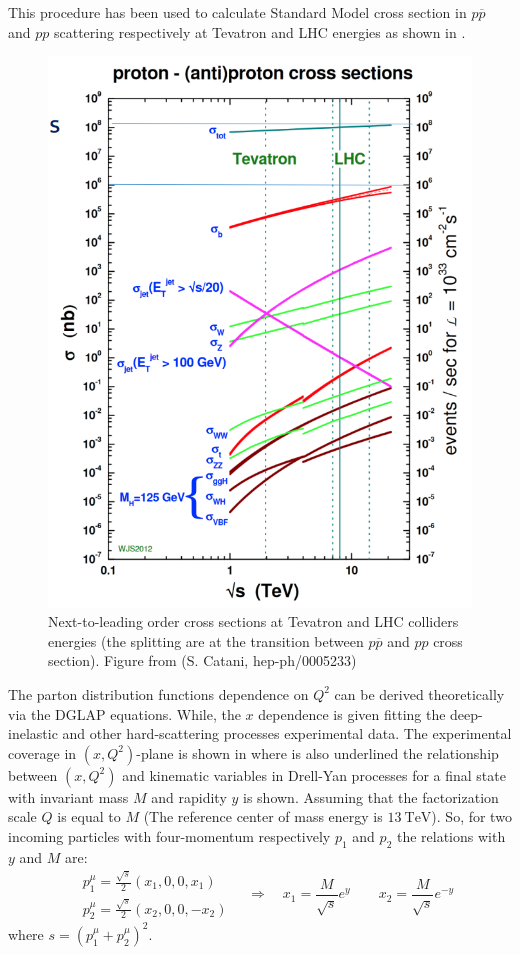 This procedure has been used to calculate Standard Model cross section in $p\overline{p}$ and $pp$ scattering respectively at Tevatron and LHC energies as shown in .

\begin{figure}[!ht]
	\centering 
	\includegraphics[width=12cm]{img/StandardModelCrossSections_color.png}
	\caption{Next-to-leading order cross sections at Tevatron and LHC colliders energies (the splitting are at the transition between $p\overline{p}$ and $pp$ cross section). Figure from (S. Catani, hep-ph/0005233)}
	\label{figure:StandardModelCrossSections}
\end{figure}

The parton distribution functions dependence on $Q^2$ can be derived theoretically via the DGLAP equations. While, the $x$ dependence is given fitting the deep-inelastic and other hard-scattering processes experimental data.
The experimental coverage in $(x,Q^2)$-plane is shown in  
where is also underlined the relationship between $(x,Q^2)$ and kinematic variables in Drell-Yan processes for a final state with invariant mass $M$ and rapidity $y$ is shown. Assuming that the factorization scale $Q$ is equal to $M$ (The reference center of mass energy is $13\ \mathrm{TeV}$). So, for two incoming particles with four-momentum respectively $p_1$ and $p_2$ the relations with $y$ and $M$ are:  
\begin{equation}
	\begin{aligned}
		&p_1^\mu=\frac{\sqrt{s}}{2}(x_1,0,0,x_1)\\
&p_2^\mu=\frac{\sqrt{s}}{2}(x_2,0,0,-x_2)
	\end{aligned} \quad\Longrightarrow\quad x_1=\frac{M}{\sqrt{s}}e^y\qquad x_2=\frac{M}{\sqrt{s}}e^{-y}
\end{equation}
where  $s=(p_1^\mu+p_2^\mu)^2$.


